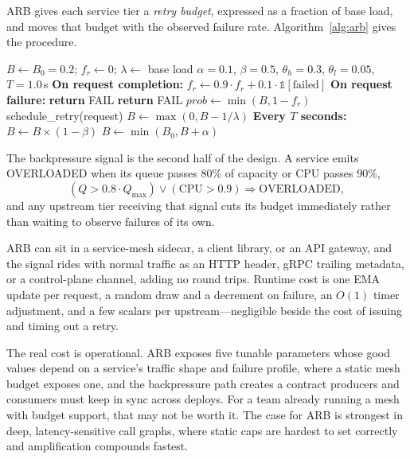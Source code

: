 \documentclass[conference]{IEEEtran}
\begin{document}
ARB gives each service tier a \textit{retry budget}, expressed as a fraction of base load, and moves that budget with the observed failure rate. Algorithm~\ref{alg:arb} gives the procedure.

\begin{algorithm}[htbp]
\caption{Adaptive Retry Budgeting (ARB)}
\label{alg:arb}
\begin{algorithmic}[1]
\STATE $B \leftarrow B_0 = 0.2$; \quad $f_r \leftarrow 0$; \quad $\lambda \leftarrow$ base load
\STATE $\alpha = 0.1$, $\beta = 0.5$, $\theta_h = 0.3$, $\theta_l = 0.05$, $T = 1.0$\,s
\STATE
\STATE \textbf{On request completion:}
\STATE $f_r \leftarrow 0.9 \cdot f_r + 0.1 \cdot \mathbb{1}[\text{failed}]$ 
\STATE
\STATE \textbf{On request failure:}
    \STATE \textbf{return} FAIL 
    \STATE \textbf{return} FAIL 
\ELSE
    \STATE $prob \leftarrow \min(B, 1 - f_r)$
        \STATE schedule\_retry(request)
        \STATE $B \leftarrow \max(0, B - 1/\lambda)$
    \ENDIF
\ENDIF
\STATE
\STATE \textbf{Every $T$ seconds:}
    \STATE $B \leftarrow B \times (1 - \beta)$ 
    \STATE $B \leftarrow \min(B_0, B + \alpha)$ 
\ENDIF
\end{algorithmic}
\end{algorithm}

The backpressure signal is the second half of the design. A service emits OVERLOADED when its queue passes 80\% of capacity or CPU passes 90\%,
\begin{equation}
(Q > 0.8 \cdot Q_{\max}) \lor (\text{CPU} > 0.9) \Rightarrow \text{OVERLOADED},
\end{equation}
and any upstream tier receiving that signal cuts its budget immediately rather than waiting to observe failures of its own.

ARB can sit in a service-mesh sidecar, a client library, or an API gateway, and the signal rides with normal traffic as an HTTP header, gRPC trailing metadata, or a control-plane channel, adding no round trips. Runtime cost is one EMA update per request, a random draw and a decrement on failure, an $O(1)$ timer adjustment, and a few scalars per upstream---negligible beside the cost of issuing and timing out a retry.

The real cost is operational. ARB exposes five tunable parameters whose good values depend on a service's traffic shape and failure profile, where a static mesh budget exposes one, and the backpressure path creates a contract producers and consumers must keep in sync across deploys. For a team already running a mesh with budget support, that may not be worth it. The case for ARB is strongest in deep, latency-sensitive call graphs, where static caps are hardest to set correctly and amplification compounds fastest.
\end{document}
